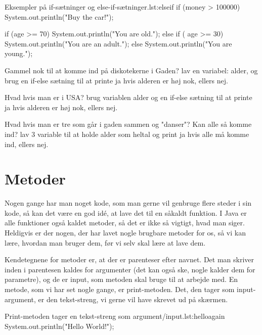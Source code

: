 {\begin{JavaCode}{Eksempler på if-sætninger og else-if-sætninger.}{lst:elseif}
	if (money > 100000) {
		System.out.println("Buy the car!");
	}
	
	if (age >= 70) {
		System.out.println("You are old.");
	} else if ( age >= 30) {
		System.out.println("You are an adult.");
	} else {
		System.out.println("You are young.");
	}
\end{JavaCode}

\begin{exercise}
	Gammel nok til at komme ind på diskotekerne i Gaden? lav en variabel: alder, og brug en if-else sætning til at printe ja hvis alderen er høj nok, ellers nej.
\end{exercise}

\begin{exercise}
	Hvad hvis man er i USA? brug variablen alder og en if-else sætning til at printe ja hvis alderen er høj nok, ellers nej.
\end{exercise}

\begin{exercise}
	Hvad hvis man er tre som går i gaden sammen og "danser"?
	Kan alle så komme ind? lav 3 variable til at holde alder som heltal og print ja hvis alle må komme ind, ellers nej.
\end{exercise}

\section{Metoder}
Nogen gange har man noget kode, som man gerne vil genbruge flere steder i sin kode, så kan det være en god idé, at lave det til en såkaldt funktion. I Java er alle funktioner også kaldet metoder, så det er ikke så vigtigt, hvad man siger. Heldigvis er der nogen, der har lavet nogle brugbare metoder for os, så vi kan lære, hvordan man bruger dem, før vi selv skal lære at lave dem. 

Kendetegnene for metoder er, at der er parenteser efter navnet. Det man skriver inden i parentesen kaldes for argumenter (det kan også ske, nogle kalder dem for parametre), og de er input, som metoden skal bruge til at arbejde med. En metode, som vi har set nogle gange, er print-metoden. Det, den tager som input-argument, er den tekst-streng, vi gerne vil have skrevet ud på skærmen.

\begin{JavaCode}{Print-metoden tager en tekst-streng som argument/input.}{lst:helloagain}
	System.out.println("Hello World!");
\end{JavaCode}

}
